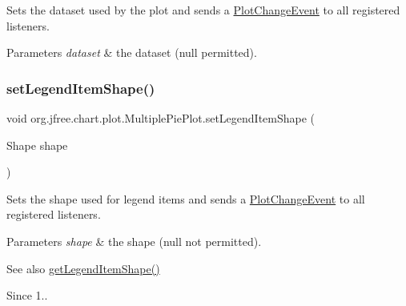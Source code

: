 Sets the dataset used by the plot and sends a \mbox{\hyperlink{}{Plot\+Change\+Event}} to all registered listeners.


\begin{DoxyParams}{Parameters}
{\em dataset} & the dataset ({\ttfamily null} permitted). \\
\hline
\end{DoxyParams}
\mbox{\label{classorg_1_1jfree_1_1chart_1_1plot_1_1_multiple_pie_plot_ab20492349d20cde1d15d70b665b1a57d}} 
\subsubsection{\texorpdfstring{set\+Legend\+Item\+Shape()}{setLegendItemShape()}}
{\footnotesize\ttfamily void org.\+jfree.\+chart.\+plot.\+Multiple\+Pie\+Plot.\+set\+Legend\+Item\+Shape (\begin{DoxyParamCaption}\item[{Shape}]{shape }\end{DoxyParamCaption})}

Sets the shape used for legend items and sends a \mbox{\hyperlink{}{Plot\+Change\+Event}} to all registered listeners.


\begin{DoxyParams}{Parameters}
{\em shape} & the shape ({\ttfamily null} not permitted).\\
\hline
\end{DoxyParams}
\begin{DoxySeeAlso}{See also}
\mbox{\hyperlink{classorg_1_1jfree_1_1chart_1_1plot_1_1_multiple_pie_plot_a7b11a3d657b29e8c9cf3cc61c20939d6}{get\+Legend\+Item\+Shape()}}
\end{DoxySeeAlso}
\begin{DoxySince}{Since}
1.. 
\end{DoxySince}
\mbox{\label{classorg_1_1jfree_1_1chart_1_1plot_1_1_multiple_pie_plot_af7c1fcbb279f6d5e2e3cf425e1390fc5}} 
